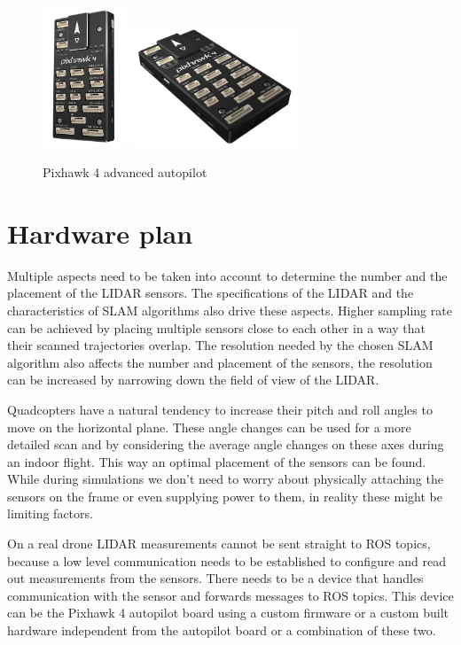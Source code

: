 \begin{figure}[h]
    \centering
    \includegraphics[width=25mm, keepaspectratio]{figures/pixhawk4.jpg}\hspace{0cm}
    \includegraphics[width=50mm, keepaspectratio]{figures/pixhawk4_2.jpg}
    \caption{Pixhawk 4 advanced autopilot}
    \label{fig:px4_sitl_ros_wrapper}
\end{figure}

\section{Hardware plan}
Multiple aspects need to be taken into account to determine the number and the placement of the LIDAR sensors.
The specifications of the LIDAR and the characteristics of SLAM algorithms also drive these aspects. 
Higher sampling rate can be achieved by placing multiple sensors close to each other in a way that 
their scanned trajectories overlap. The resolution needed by the chosen SLAM algorithm also affects 
the number and placement of the sensors, the resolution can be increased by narrowing down the field of 
view of the LIDAR.

Quadcopters have a natural tendency to increase their pitch and roll angles to move on the horizontal plane.
These angle changes can be used for a more detailed scan and by considering the average angle changes on 
these axes during an indoor flight. This way an optimal placement of the sensors can be found. 
While during simulations we don't need to worry about physically attaching the sensors on the frame or even
supplying power to them, in reality these might be limiting factors.

On a real drone LIDAR measurements cannot be sent straight to ROS topics, because a low level communication needs
to be established to configure and read out measurements from the sensors. There needs to be a device that 
handles communication with the sensor and forwards messages to ROS topics.
This device can be the Pixhawk 4 autopilot board using a custom firmware or a custom built hardware 
independent from the autopilot board or a combination of these two.


